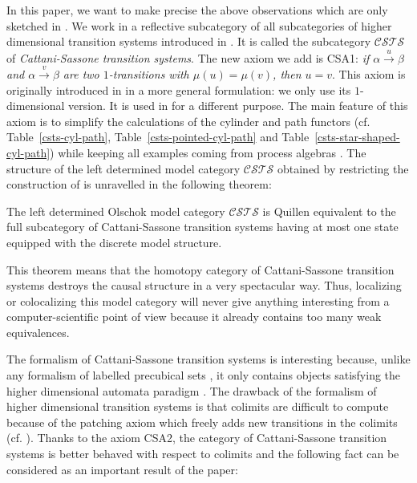 \documentclass[a4paper,12pt]{amsart}
\newenvironment{customthm}[1]
  {\innercustomthm}
  {\endinnercustomthm}
\begin{document}
In this paper, we want to make precise the above observations which
are only sketched in \cite{biscsts1}.  We work in a reflective
subcategory of all subcategories of higher dimensional transition
systems introduced in \cite{biscsts1}. It is called the subcategory
${\mathcal{C\!S\!T\!S}}$ of \emph{Cattani-Sassone transition systems}. The new axiom we
add is CSA1: \emph{if $\alpha \stackrel{u}\to \beta$ and $\alpha
  \stackrel{v}\to \beta$ are two $1$-transitions with $\mu(u)=\mu(v)$,
  then $u=v$}. This axiom is originally introduced in \cite{MR1461821}
in a more general formulation: we only use its $1$-dimensional
version. It is used in \cite{cubicalhdts} for a different purpose. The
main feature of this axiom is to simplify the calculations of the
cylinder and path functors (cf. Table~\ref{csts-cyl-path},
Table~\ref{csts-pointed-cyl-path} and
Table~\ref{csts-star-shaped-cyl-path}) while keeping all examples
coming from process algebras \cite{ccsprecub} \cite{symcub}
\cite{hdts}.  The structure of the left determined model category
${\mathcal{C\!S\!T\!S}}$ obtained by restricting the construction of \cite{biscsts1} is
unravelled in the following theorem:

\begin{customthm}{\ref{description-csts}} The left determined Olschok
  model category ${\mathcal{C\!S\!T\!S}}$ is Quillen equivalent to the full subcategory
  of Cattani-Sassone transition systems having at most one state
  equipped with the discrete model structure.
\end{customthm}

This theorem means that the homotopy category of Cattani-Sassone
transition systems destroys the causal structure in a very spectacular
way. Thus, localizing or colocalizing this model category will never
give anything interesting from a computer-scientific point of view
because it already contains too many weak equivalences.

The formalism of Cattani-Sassone transition systems is interesting
because, unlike any formalism of labelled precubical sets
\cite{ccsprecub} \cite{symcub} \cite{homotopyprecubical}, it only
contains objects satisfying the higher dimensional automata paradigm
\cite[Definition~7.1]{hdts}. The drawback of the formalism of higher
dimensional transition systems is that colimits are difficult to
compute because of the patching axiom which freely adds new
transitions in the colimits (cf. \cite[Proposition~A.1]{csts}). Thanks
to the axiom CSA2, the category of Cattani-Sassone transition systems
is better behaved with respect to colimits and the following fact can
be considered as an important result of the paper:
\end{document}
